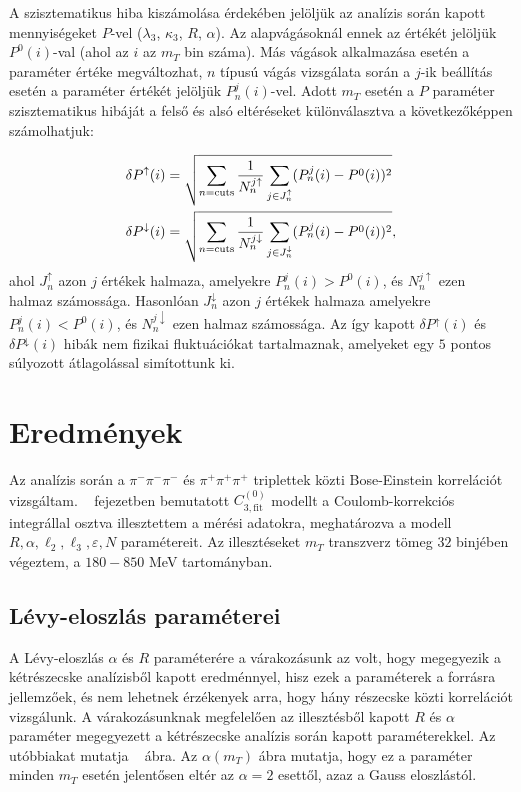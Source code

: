 \documentclass[11pt,a4paper]{article}
\numberwithin{equation}{subsection}
\numberwithin{figure}{section}
\begin{document}
A szisztematikus hiba kiszámolása érdekében jelöljük az analízis során kapott mennyiségeket $P$-vel ($\lambda_3$, $\kappa_3$, $R$, $\alpha$). Az alapvágásoknál ennek az értékét jelöljük $P^0(i)$-val (ahol az $i$ az $m_T$ bin száma). Más vágások alkalmazása esetén a paraméter értéke megváltozhat, $n$ típusú vágás vizsgálata során a $j$-ik beállítás esetén a paraméter értékét jelöljük $P_n^j(i)$-vel. Adott $m_T$ esetén a $P$ paraméter szisztematikus hibáját a felső és alsó eltéréseket különválasztva a következőképpen számolhatjuk:

\begin{align}
\delta P^\uparrow(i)  &=\sqrt{\sum_{n={\rm cuts}}\frac{1}{N_n^{j\uparrow  }}\sum_{j\in J_n^\uparrow  }(P_n^j(i)-P^0(i))^2}\\
\delta P^\downarrow(i)&=\sqrt{\sum_{n={\rm cuts}}\frac{1}{N_n^{j\downarrow}}\sum_{j\in J_n^\downarrow}(P_n^j(i)-P^0(i))^2},
\end{align}
ahol $J_n^\uparrow$ azon $j$ értékek halmaza, amelyekre $P_n^j(i)>P^0(i)$, és $N_n^{j\uparrow}$ ezen halmaz számossága. Hasonlóan $J_n^\downarrow$ azon $j$ értékek halmaza amelyekre $P_n^j(i)<P^0(i)$, és  $N_n^{j\downarrow}$ ezen halmaz számossága. Az így kapott $\delta
P^\uparrow(i)$ és $\delta P^\downarrow(i)$ hibák nem fizikai fluktuációkat tartalmaznak, amelyeket egy $5$ pontos súlyozott átlagolással simítottunk ki.




\section{Eredmények}

Az analízis során a $\pi^-\pi^-\pi^-$ és $\pi^+\pi^+\pi^+$ triplettek közti Bose-Einstein korrelációt vizsgáltam. ~ fejezetben bemutatott $C_{3, \mathrm{fit}}^{(0)}$ modellt a Coulomb-korrekciós integrállal osztva illesztettem a mérési adatokra, meghatározva a modell $R, \alpha, \ell_2, \ell_3, \varepsilon, N$ paramétereit. Az illesztéseket $m_T$ transzverz tömeg $32$ binjében végeztem, a $180-850$ MeV tartományban.

\subsection{Lévy-eloszlás paraméterei}

A Lévy-eloszlás $\alpha$ és $R$ paraméterére a várakozásunk az volt, hogy megegyezik a kétrészecske analízisből kapott eredménnyel, hisz ezek a paraméterek a forrásra jellemzőek, és nem lehetnek érzékenyek arra, hogy hány részecske közti korrelációt vizsgálunk.  A várakozásunknak megfelelően az illesztésből kapott $R$ és $\alpha$ paraméter megegyezett a kétrészecske analízis során kapott paraméterekkel. Az utóbbiakat mutatja ~ ábra. Az $\alpha(m_T)$ ábra mutatja, hogy ez a paraméter minden $m_T$ esetén jelentősen eltér az $\alpha=2$ esettől, azaz a Gauss eloszlástól.
\end{document}
